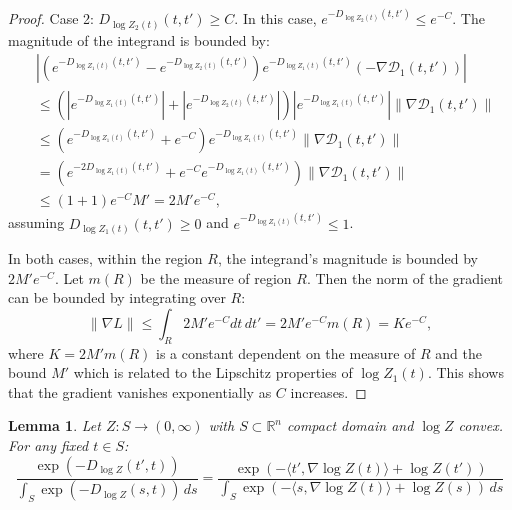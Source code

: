 \documentclass{article}
\theoremstyle{plain}
\newtheorem{lemma}[theorem]{Lemma}
\theoremstyle{definition}
\theoremstyle{remark}
\begin{document}
\begin{proof}
Case 2: $D_{\log Z_{2}(t)}(t,t') \geq C$. In this case, $e^{-D_{\log Z_{2}(t)}(t,t')} \leq e^{-C}$. The magnitude of the integrand is bounded by:
\begin{align*}
    & \left| \left( e^{-D_{\log Z_{1}(t)}(t,t')} - e^{-D_{\log Z_{2}(t)}(t,t')} \right) e^{-D_{\log Z_{1}(t)}(t,t')} (-\nabla \mathcal{D}_{1}(t,t')) \right| \\
    & \leq \left( |e^{-D_{\log Z_{1}(t)}(t,t')}| + |e^{-D_{\log Z_{2}(t)}(t,t')}| \right) |e^{-D_{\log Z_{1}(t)}(t,t')}| \|\nabla \mathcal{D}_{1}(t,t')\| \\
    & \leq \left( e^{-D_{\log Z_{1}(t)}(t,t')} + e^{-C} \right) e^{-D_{\log Z_{1}(t)}(t,t')} \|\nabla \mathcal{D}_{1}(t,t')\| \\
    & = \left( e^{-2D_{\log Z_{1}(t)}(t,t')} + e^{-C} e^{-D_{\log Z_{1}(t)}(t,t')} \right) \|\nabla \mathcal{D}_{1}(t,t')\| \\
    & \leq (1 + 1) e^{-C} M' = 2 M' e^{-C},
\end{align*}
assuming $D_{\log Z_{1}(t)}(t,t') \geq 0$ and $e^{-D_{\log Z_{1}(t)}(t,t')} \leq 1$.

In both cases, within the region $R$, the integrand's magnitude is bounded by $2 M' e^{-C}$. Let $m(R)$ be the measure of region $R$. Then the norm of the gradient can be bounded by integrating over $R$:
\begin{equation}
    \|\nabla L\| \leq \int_{R} 2 M' e^{-C} dt \, dt' = 2 M' e^{-C} m(R) = K e^{-C},
\end{equation}
where $K = 2 M' m(R)$ is a constant dependent on the measure of $R$ and the bound $M'$ which is related to the Lipschitz properties of $\log Z_{1}(t)$. This shows that the gradient vanishes exponentially as $C$ increases.
\end{proof}


\begin{lemma}
Let $ Z: S \to (0,\infty) $ with $ S \subset \mathbb{R}^n $ compact domain and $ \log Z $ convex. For any fixed $ t \in S $:
\begin{equation}\label{eq:lemma_statement}
\frac{\exp\left(-D_{\log Z}(t', t)\right)}{\int_{S} \exp\left(-D_{\log Z}(s, t)\right) \, ds} = \frac{\exp\left(-\langle t', \nabla \log Z(t) \rangle + \log Z(t')\right)}{\int_{S} \exp\left(-\langle s, \nabla \log Z(t) \rangle + \log Z(s)\right) \, ds}
\end{equation}
\end{lemma}
\end{document}
